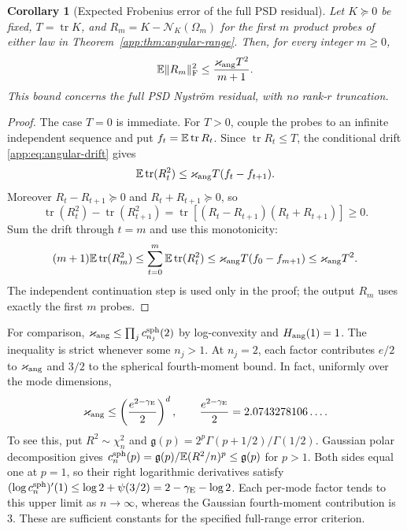\documentclass[11pt,a4paper]{article}
\newtheorem{corollary}[theorem]{Corollary}
\theoremstyle{definition}\newtheorem{definition}[theorem]{Definition}
\theoremstyle{remark}\newtheorem{remark}[theorem]{Remark}
\numberwithin{equation}{section}
\newcommand{\gmom}{\mathfrak g}
\newcommand{\norm}[1]{\lVert#1\rVert}\newcommand{\ip}[2]{\langle#1,#2\rangle}
\DeclareMathOperator{\tr}{tr}\DeclareMathOperator{\rank}{rank}
\begin{document}
\begin{corollary}[Expected Frobenius error of the full PSD residual]
\label{app:cor:angular-frobenius}
Let $K\succeq0$ be fixed, $T=\tr K$, and
$R_m=K-\mathcal N_K(\Omega_m)$ for the first $m$ product probes of
either law in Theorem~\ref{app:thm:angular-range}. Then, for every
integer $m\ge0$,
\begin{equation}\label{app:eq:angular-frobenius}
 \E\norm{R_m}_\F^2
 \le\frac{\varkappa_{\rm ang}T^2}{m+1}.
\end{equation}
This bound concerns the full PSD Nystr\"om residual, with no
rank-$r$ truncation.
\end{corollary}
\begin{proof}
\label{proof:angular-frobenius}
The case $T=0$ is immediate. For $T>0$, couple the probes to an
infinite independent sequence and put $f_t=\E\tr R_t$.
Since $\tr R_t\le T$, the conditional drift
\eqref{app:eq:angular-drift} gives
\[
 \E\tr(R_t^2)
 \le\varkappa_{\rm ang}T(f_t-f_{t+1}).
\]
Moreover $R_t-R_{t+1}\succeq0$ and $R_t+R_{t+1}\succeq0$, so
\[
 \tr(R_t^2)-\tr(R_{t+1}^2)
 =\tr[(R_t-R_{t+1})(R_t+R_{t+1})]\ge0.
\]
Sum the drift through $t=m$ and use this monotonicity:
\[
 (m+1)\E\tr(R_m^2)
 \le\sum_{t=0}^m\E\tr(R_t^2)
 \le\varkappa_{\rm ang}T(f_0-f_{m+1})
 \le\varkappa_{\rm ang}T^2.
\]
The independent continuation step is used only in the proof; the
output $R_m$ uses exactly the first $m$ probes.
\end{proof}

For comparison, $\varkappa_{\rm ang}\le\prod_j c_{n_j}^{\rm sph}(2)$ by
log-convexity and $H_{\rm ang}(1)=1$. The inequality is strict whenever
some $n_j>1$. At $n_j=2$, each factor contributes $e/2$ to
$\varkappa_{\rm ang}$ and $3/2$ to the spherical fourth-moment bound.
In fact, uniformly over the mode dimensions,
\[
 \varkappa_{\rm ang}\le
 \left(\frac{e^{2-\gamma_{\rm E}}}{2}\right)^d,
 \qquad \frac{e^{2-\gamma_{\rm E}}}{2}=2.0743278106\ldots.
\]
To see this, put $R^2\sim\chi_n^2$ and
$\gmom(p)=2^p\Gamma(p+1/2)/\Gamma(1/2)$.
Gaussian polar decomposition gives
$c_n^{\rm sph}(p)=\gmom(p)/\E(R^2/n)^p\le\gmom(p)$ for $p>1$.
Both sides equal one at $p=1$, so their right logarithmic derivatives
satisfy $(\log c_n^{\rm sph})'(1)\le\log2+\psi(3/2)=2-\gamma_{\rm E}-\log2$.
Each per-mode factor tends to this upper limit as $n\to\infty$,
whereas the Gaussian fourth-moment contribution is $3$.
These are sufficient constants for the specified full-range error criterion.
\end{document}
